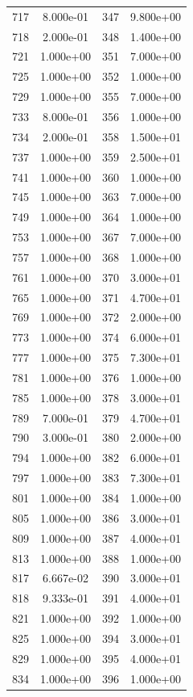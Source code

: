 \documentclass[12pt]{article}
\begin{document}
\begin{longtable}{@{}cccc@{}}
717 & 8.000e-01 & 347 & 9.800e+00 \\
718 & 2.000e-01 & 348 & 1.400e+00 \\
721 & 1.000e+00 & 351 & 7.000e+00 \\
725 & 1.000e+00 & 352 & 1.000e+00 \\
729 & 1.000e+00 & 355 & 7.000e+00 \\
733 & 8.000e-01 & 356 & 1.000e+00 \\
734 & 2.000e-01 & 358 & 1.500e+01 \\
737 & 1.000e+00 & 359 & 2.500e+01 \\
741 & 1.000e+00 & 360 & 1.000e+00 \\
745 & 1.000e+00 & 363 & 7.000e+00 \\
749 & 1.000e+00 & 364 & 1.000e+00 \\
753 & 1.000e+00 & 367 & 7.000e+00 \\
757 & 1.000e+00 & 368 & 1.000e+00 \\
761 & 1.000e+00 & 370 & 3.000e+01 \\
765 & 1.000e+00 & 371 & 4.700e+01 \\
769 & 1.000e+00 & 372 & 2.000e+00 \\
773 & 1.000e+00 & 374 & 6.000e+01 \\
777 & 1.000e+00 & 375 & 7.300e+01 \\
781 & 1.000e+00 & 376 & 1.000e+00 \\
785 & 1.000e+00 & 378 & 3.000e+01 \\
789 & 7.000e-01 & 379 & 4.700e+01 \\
790 & 3.000e-01 & 380 & 2.000e+00 \\
794 & 1.000e+00 & 382 & 6.000e+01 \\
797 & 1.000e+00 & 383 & 7.300e+01 \\
801 & 1.000e+00 & 384 & 1.000e+00 \\
805 & 1.000e+00 & 386 & 3.000e+01 \\
809 & 1.000e+00 & 387 & 4.000e+01 \\
813 & 1.000e+00 & 388 & 1.000e+00 \\
817 & 6.667e-02 & 390 & 3.000e+01 \\
818 & 9.333e-01 & 391 & 4.000e+01 \\
821 & 1.000e+00 & 392 & 1.000e+00 \\
825 & 1.000e+00 & 394 & 3.000e+01 \\
829 & 1.000e+00 & 395 & 4.000e+01 \\
834 & 1.000e+00 & 396 & 1.000e+00 \\

\end{longtable}
\end{document}
